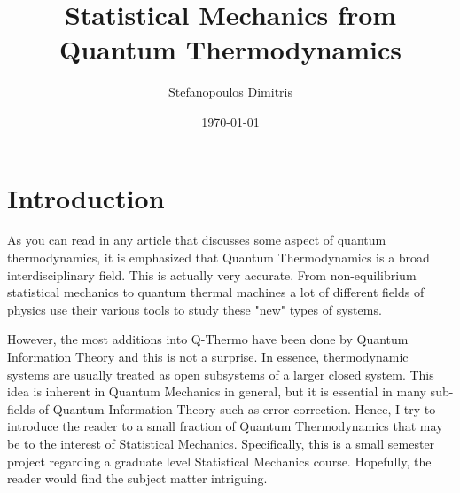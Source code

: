 \documentclass[a4paper,12pt]{article}
\begin{document}
\pagestyle{empty}
\title{Statistical Mechanics from Quantum Thermodynamics}
\author{Stefanopoulos Dimitris}
\date{\today}
\maketitle
\pagestyle{plain}

\section{Introduction} \par  As you can read in any article that discusses some aspect of quantum thermodynamics, it is emphasized that Quantum Thermodynamics is a broad interdisciplinary field. This is actually very accurate. From non-equilibrium statistical mechanics to quantum thermal machines a lot of different fields of physics use their various tools to study these "new" types of systems. \par However, the most additions into Q-Thermo have been done by Quantum Information Theory and this is not a surprise. In essence, thermodynamic systems are usually treated as open subsystems of a larger closed system. This idea is inherent in Quantum Mechanics in general, but it is essential in many sub-fields of Quantum Information Theory such as error-correction. Hence, I try to introduce the reader to a small fraction of Quantum Thermodynamics that may be to the interest of Statistical Mechanics. Specifically, this is a small semester project regarding a graduate level Statistical Mechanics course. Hopefully, the reader would find the subject matter intriguing.
\end{document}
